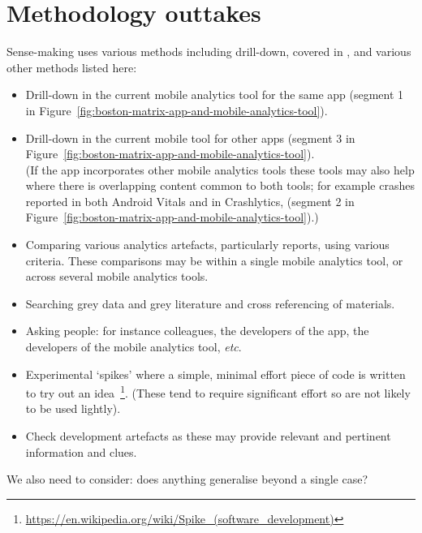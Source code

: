 \chapter{Methodology outtakes}

Sense-making uses various methods including drill-down, covered in , and various other methods listed here:

\begin{itemize}
\itemsep0em
    \item Drill-down in the current mobile analytics tool for the same app (segment 1 in Figure~\ref{fig:boston-matrix-app-and-mobile-analytics-tool}).
    \item Drill-down in the current mobile tool for other apps (segment 3 in Figure~\ref{fig:boston-matrix-app-and-mobile-analytics-tool}). \\ (If the app incorporates other mobile analytics tools these tools may also help where there is overlapping content common to both tools; for example crashes reported in both Android Vitals and in Crashlytics, (segment 2 in Figure~\ref{fig:boston-matrix-app-and-mobile-analytics-tool}).)
    \item Comparing various analytics artefacts, particularly reports, using various criteria. These comparisons may be within a single mobile analytics tool, or across several mobile analytics tools.
    \item Searching grey data and grey literature and cross referencing of materials.
    \item Asking people: for instance colleagues, the developers of the app, the developers of the mobile analytics tool, \textit{etc}.
    \item Experimental `spikes' where a simple,  minimal effort piece of code is written to try out an idea~\footnote{\url{https://en.wikipedia.org/wiki/Spike_(software_development)}}. (These tend to require significant effort so are not likely to be used lightly).
    \item Check development artefacts as these may provide relevant and pertinent information and clues.
\end{itemize}


We also need to consider: does anything generalise beyond a single case?


